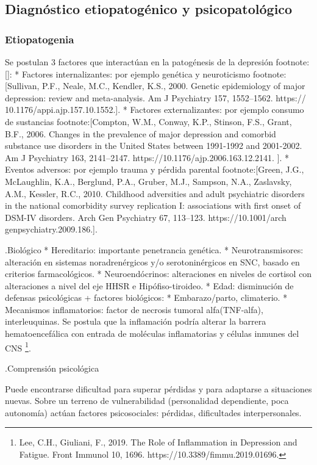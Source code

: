 \subsection*{Diagnóstico etiopatogénico y psicopatológico}
\subsubsection*{Etiopatogenia}
Se postulan 3 factores que interactúan en la patogénesis de la depresión footnote:[]:
* Factores internalizantes: por ejemplo genética y neuroticismo footnote:[Sullivan, P.F., Neale, M.C., Kendler, K.S., 2000. Genetic epidemiology of major
depression: review and meta-analysis. Am J Psychiatry 157, 1552–1562. https://
10.1176/appi.ajp.157.10.1552.].
* Factores externalizantes: por ejemplo consumo de sustancias footnote:[Compton, W.M., Conway, K.P., Stinson, F.S., Grant, B.F., 2006. Changes in the
prevalence of major depression and comorbid substance use disorders in the United
States between 1991-1992 and 2001-2002. Am J Psychiatry 163, 2141–2147.
https://10.1176/ajp.2006.163.12.2141. ].
* Eventos adversos: por ejemplo trauma y pérdida parental footnote:[Green, J.G., McLaughlin, K.A., Berglund, P.A., Gruber, M.J., Sampson, N.A.,
Zaslavsky, A.M., Kessler, R.C., 2010. Childhood adversities and adult psychiatric
disorders in the national comorbidity survey replication I: associations with first
onset of DSM-IV disorders. Arch Gen Psychiatry 67, 113–123. https://10.1001/arch
genpsychiatry.2009.186.].

.Biológico
* Hereditario: importante penetrancia genética.
* Neurotransmisores: alteración en sistemas noradrenérgicos y/o serotoninérgicos en SNC, basado en criterios farmacológicos.
* Neuroendócrinos: alteraciones en niveles de cortisol con alteraciones a nivel del eje HHSR e Hipófiso-tiroideo.
* Edad: disminución de defensas psicológicas + factores biológicos:
* Embarazo/parto, climaterio.
* Mecanismos inflamatorios: factor de necrosis tumoral alfa(TNF-alfa), interleuquinas. Se postula que la inflamación podría alterar la barrera hematoencefálica con entrada de moléculas inflamatorias y células inmunes del CNS \footnote{Lee, C.H., Giuliani, F., 2019. The Role of Inflammation in Depression and Fatigue. Front
Immunol 10, 1696. https://10.3389/fimmu.2019.01696.}.

.Comprensión psicológica

Puede encontrarse dificultad para superar pérdidas y para adaptarse a situaciones nuevas. Sobre un terreno de vulnerabilidad (personalidad dependiente, poca autonomía) actúan factores psicosociales: pérdidas, dificultades interpersonales.

